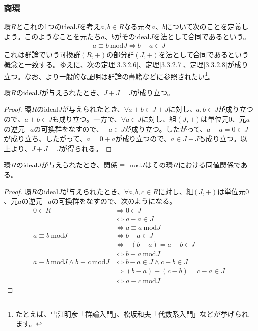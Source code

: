 \documentclass[dvipdfmx]{jsarticle}
\begin{document}
\subsubsection{商環}%
\begin{dfn}
環$R$とこれの1つのideal$J$を考え$a,b \in R$なる元々$a$、$b$について次のことを定義しよう。このようなことを元たち$a$、$b$がそのideal$J$を法として合同であるという。
\begin{align*}
a \equiv b\ \mathrm{mod}J \Leftrightarrow b - a \in J
\end{align*}
これは群論でいう可換群$(R, + )$の部分群$(J, + )$を法として合同であるという概念と一致する。ゆえに、次の定理\ref{3.3.2.6}、定理\ref{3.3.2.7}、定理\ref{3.3.2.8}が成り立つ。なお、より一般的な証明は群論の書籍などに参照されたい\footnote{たとえば、雪江明彦「群論入門」、松坂和夫「代数系入門」などが挙げられます。}。
\end{dfn}
\begin{thm}\label{3.3.2.6}
環$R$のideal$J$が与えられたとき、$J + J = J$が成り立つ。
\end{thm}
\begin{proof}
環$R$のideal$J$が与えられたとき、$\forall a + b \in J + J$に対し、$a,b \in J$が成り立つので、$a + b \in J$も成り立つ。一方で、$\forall a \in J$に対し、組$(J, + )$は単位元$0$、元$a$の逆元$- a$の可換群をなすので、$- a \in J$が成り立つ。したがって、$a - a = 0 \in J$が成り立ち、したがって、$a = 0 + a$が成り立つので、$a \in J + J$も成り立つ。以上より、$J + J = J$が得られる。
\end{proof}
\begin{thm}\label{3.3.2.7}
環$R$のideal$J$が与えられたとき、関係$\equiv \ \mathrm{mod}J $はその環$R$における同値関係である。
\end{thm}
\begin{proof}
環$R$のideal$J$が与えられたとき、$\forall a,b,c \in R$に対し、組$(J, + )$は単位元$0$、元$a$の逆元$- a$の可換群をなすので、次のようになる。
\begin{align*}
0 \in R &\Rightarrow 0 \in J\\
&\Leftrightarrow a - a \in J\\
&\Leftrightarrow a \equiv a\ \mathrm{mod}J \\
a \equiv b\ \mathrm{mod}J &\Leftrightarrow b - a \in J\\
&\Leftrightarrow - (b - a) = a - b \in J\\
&\Leftrightarrow b \equiv a\ \mathrm{mod}J \\
a \equiv b\ \mathrm{mod}J \land b \equiv c\ \mathrm{mod}J &\Leftrightarrow b - a \in J \land c - b \in J\\
&\Rightarrow (b - a) + (c - b) = c - a \in J\\
&\Leftrightarrow a \equiv c\ \mathrm{mod}J 
\end{align*}
\end{proof}
\end{document}
